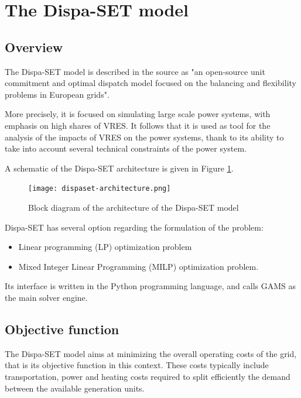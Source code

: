 \section{The Dispa-SET model}

\subsection{Overview}

The Dispa-SET model \cite{dispaset} is described in the source \cite{dispaset2} as "an open-source unit commitment and optimal dispatch model focused on the balancing and flexibility problems in European grids".

More precisely, it is focused on simulating large scale power systems, with emphasis on high shares of VRES. It follows that it is used as tool for the analysis of the impacts of VRES on the power systems, thank to its ability to take into account several technical constraints of the power system.

A schematic of the Dispa-SET architecture is given in Figure \ref{dispaset-architecture}.

\begin{figure}[h]
    \texttt{[image: dispaset-architecture.png]}
    \caption{Block diagram of the architecture of the Dispa-SET model}
    \label{dispaset-architecture}
\end{figure}

Dispa-SET has several option regarding the formulation of the problem:
\begin{itemize}
    \item Linear programming (LP) optimization problem
    \item Mixed Integer Linear Programming (MILP) optimization problem.
\end{itemize}

Its interface is written in the Python programming language, and calls GAMS \cite{GAMS} as the main solver engine.

\subsection{Objective function}

The Dispa-SET model aims at minimizing the overall operating costs of the grid, that is its objective function in this context. These costs typically include transportation, power and heating costs required to split efficiently the demand between the available generation units.

